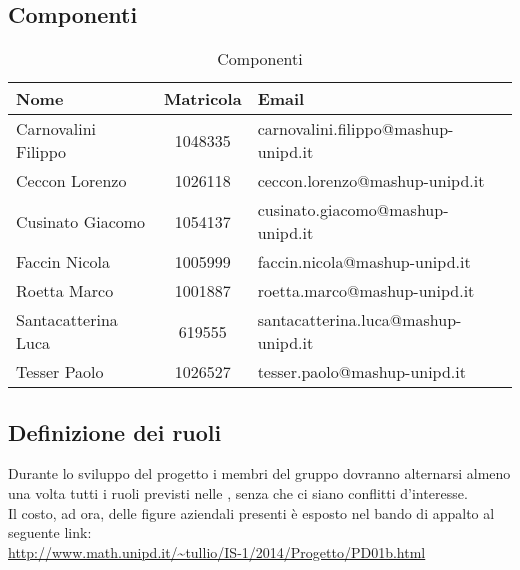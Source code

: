	\subsection{Componenti} %
	\label{sub:componenti}
		\begin{table}[!h]
			\begin{center}
				\begin{tabularx}{0.95\textwidth}{|l|c|X|}
					\hline
					\textbf{Nome} & \textbf{Matricola} & \textbf{Email} \\
					\hline
					Carnovalini Filippo &
					1048335 &
					carnovalini.filippo@mashup-unipd.it  \\
					\hline
			
					Ceccon Lorenzo &
					1026118 &
					ceccon.lorenzo@mashup-unipd.it \\
					\hline
			
					Cusinato Giacomo &
					1054137 &
					cusinato.giacomo@mashup-unipd.it \\
					\hline
			
					Faccin Nicola &
					1005999 &
					faccin.nicola@mashup-unipd.it \\
					\hline
			
					Roetta Marco &
					1001887 &
					roetta.marco@mashup-unipd.it \\
					\hline
			
					Santacatterina Luca &
				 	619555 &
					santacatterina.luca@mashup-unipd.it \\
					\hline
			
					Tesser Paolo &
					1026527 &
					tesser.paolo@mashup-unipd.it \\
					\hline					
				\end{tabularx}	
			\end{center}
		\caption{Componenti}
		\end{table}

	\subsection{Definizione dei ruoli} %
	\label{sub:definizione_dei_ruoli}
	Durante lo sviluppo del progetto i membri del gruppo dovranno alternarsi almeno una volta tutti i ruoli previsti nelle \docNameVersionNdP{}, senza che ci siano conflitti d'interesse. \\
	Il costo, ad ora, delle figure aziendali presenti è esposto nel bando di appalto al seguente link: \\
	\url{http://www.math.unipd.it/~tullio/IS-1/2014/Progetto/PD01b.html}

